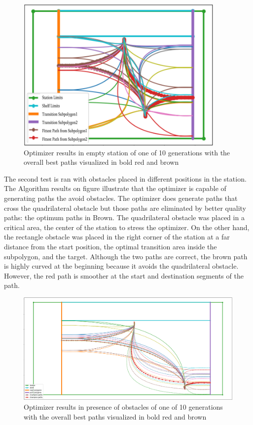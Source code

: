\begin{figure}[H]
    \begin{center}
        \includegraphics[width=4in]{images/Chap3/Gen1_crop.png} %
        \caption{Optimizer results in empty station of one of 10 generations with the overall best paths 
        visualized in bold red and brown}
        \label{OptResult1}
        \end{center}    
\end{figure}


The second test is ran with obstacles placed in different positions in the station. 
The Algorithm results on figure  illustrate that the optimizer is capable of generating paths the avoid 
obstacles. The optimizer does generate paths that cross the quadrilateral obstacle but those paths 
are eliminated by better quality paths: the optimum paths in Brown. The quadrilateral obstacle was placed 
in a critical area, the center of the station to stress the optimizer. On the other hand, 
the rectangle obstacle was placed in the right corner of the station at a far distance from the start position,
the optimal transition area inside the subpolygon, and the target.
Although the two paths are  correct, the brown path is highly curved at the beginning because it avoids the 
quadrilateral obstacle. However, the red path is smoother at the start and destination segments of the path.

\begin{figure}[H]
    \begin{center}
        \includegraphics[width=5in]{images/Chap3/scenario3_crop.png} %
        \caption{Optimizer results in presence of obstacles of one of 10 generations with the overall best paths 
        visualized in bold red and brown}
        \label{OptResult2}
        \end{center}    
\end{figure}

